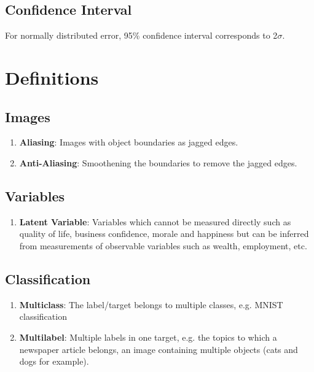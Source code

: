 \documentclass[a4paper, 12pt]{report}
\begin{document}
\section{Confidence Interval}
For normally distributed error, 95\% confidence interval corresponds to 2$\sigma$.

\chapter{Definitions}

\section{Images}
\begin{enumerate}

\item \textbf{Aliasing}: Images with object boundaries as jagged edges. 
\item \textbf{Anti-Aliasing}: Smoothening the boundaries to remove the jagged edges.

\end{enumerate}

\section{Variables}
\begin{enumerate}
\item \textbf{Latent Variable}: Variables which cannot be measured directly such as quality of life, business confidence, morale and happiness but can be inferred from measurements of observable variables such as wealth, employment, etc.

\end{enumerate}

\section{Classification}
\begin{enumerate}
\item \textbf{Multiclass}: The label/target belongs to multiple classes, e.g. MNIST classification
\item \textbf{Multilabel}: Multiple labels in one target, e.g. the topics to which a newspaper article belongs, an image containing multiple objects (cats and dogs for example).
\end{enumerate}
\end{document}
